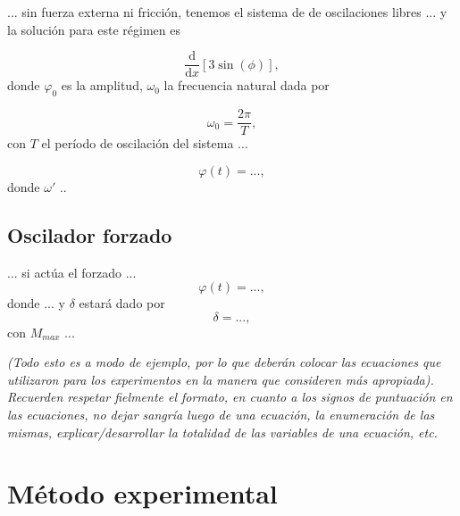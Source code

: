 \documentclass[12pt,a4paper]{article}
\begin{document}
... sin fuerza externa ni fricción, tenemos el sistema de de oscilaciones libres ... y la solución para este régimen es

\begin{equation}
    \frac{\mathrm{d}}{\mathrm{d}x}\left[3 \sin\left({\phi}\right)\right],
\end{equation}
donde $\varphi_0$ es la amplitud, $\omega_0$ la frecuencia natural dada por

\begin{equation}\label{eq2}
    \omega_0=\frac{2\pi}{T},
\end{equation}
con $T$ el período de oscilación del sistema ...

\begin{equation}
    \varphi(t) = ... ,
\end{equation}
donde $\omega'$ ..

\subsection{Oscilador forzado}

... si actúa el forzado ...
\begin{equation}
    \varphi(t) = ... ,
\end{equation}
donde ... y $\delta$ estará dado por
\begin{equation}
    \delta = ... ,
\end{equation}
con $M_{max}$ ...

\textit{(Todo esto es a modo de ejemplo, por lo que deberán colocar las ecuaciones que utilizaron para los experimentos en la manera que consideren más apropiada). Recuerden respetar fielmente el formato, en cuanto a los signos de puntuación en las ecuaciones, no dejar sangría luego de una ecuación, la enumeración de las mismas, explicar/desarrollar la totalidad de las variables de una ecuación, etc.}


\section{Método experimental}
\end{document}
